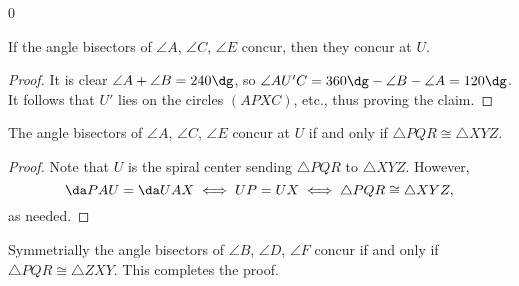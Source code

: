 \setcounter{iclaim}0
\begin{iclaim}
    If the angle bisectors of $\angle A$, $\angle C$, $\angle E$ concur, then they concur at $U$.
\end{iclaim}
\begin{proof}
    It is clear $\angle A+\angle B=240\dg$, so $\angle AU'C=360\dg-\angle B-\angle A=120\dg$. It follows that $U'$ lies on the circles $(APXC)$, etc., thus proving the claim.
\end{proof}
\begin{iclaim}
    The angle bisectors of $\angle A$, $\angle C$, $\angle E$ concur at $U$ if and only if $\triangle PQR\cong\triangle XYZ$.
\end{iclaim}
\begin{proof}
    Note that $U$ is the spiral center sending $\triangle PQR$ to $\triangle XYZ$. However, \[\da PAU=\da UAX\iff UP=UX\iff\triangle PQR\cong\triangle XYZ,\]
    as needed.
\end{proof}

Symmetrially the angle bisectors of $\angle B$, $\angle D$, $\angle F$ concur if and only if $\triangle PQR\cong\triangle ZXY$. This completes the proof.

